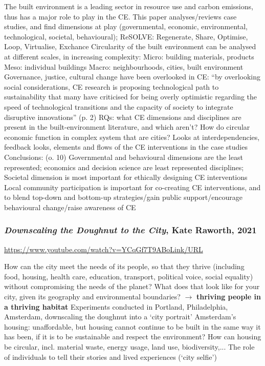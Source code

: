 \documentclass{article}
\begin{document}
\begin{outline}
	\1 The built environment is a leading sector in resource use and carbon emissions, thus has a major role to play in the CE. This paper analyses/reviews case studies, and find dimensions at play (governmental, economic, environmental, technological, societal, behavioural); 
	\1 ReSOLVE: Regenerate, Share, Optimise, Loop, Virtualise, Exchance
	\1 Circularity of the built environment can be analysed at different scales, in increasing complexity:
		\2 Micro: building materials, products
		\2 Meso: individual buildings
		\2 Macro: neighbourhoods, cities, built environment
	\1 Governance, justice, cultural change have been overlooked in CE: ``by overlooking social considerations, CE research is proposing  technological path to sustainability that many have criticised for being overly optimistic regarding the speed of technological transitions and the capacity of society to integrate disruptive innovations'' (p. 2)
	\1 RQs:  what CE dimensions and disciplines are present in the built-environment literature, and which aren't? How do circular economic function in complex system that are cities? 
		\2 Looks at interdependencies, feedback looks, elements and flows of the CE interventions in the case studies
	\1 Conclusions: (o. 10)
		\2 Governmental and behavioural dimensions are the least represented; economics and decision science are least represented disciplines; 
		\2 Societal dimension is most important for ethically designing CE interventions
		\2 Local community participation is important for co-creating CE interventions, and to blend top-down and bottom-up strategies/gain public support/encourage behavioural change/raise awareness of CE
	
\end{outline}

\subsubsection{\textit{Downscaling the Doughnut to the City}, Kate Raworth, 2021}

\url{https://www.youtube.com/watch?v=YCqGf7T9ABoLink/URL}

\begin{outline}
	\1 How can the city meet the needs of its people, so that they thrive (including food, housing, health care, education, transport, political voice, social equality) without compromising the needs of the planet? What does that look like for your city, given its geography and environmental boundaries? $\rightarrow$ \textbf{thriving people in a thriving habitat}
	\1	Experiments conducted in Portland, Philadelphia, Amsterdam, downscaling the doughnut into a `city portrait'
		\2 Amsterdam's housing: unaffordable, but housing cannot continue to be built in the same way it has been, if it is to be sustainable and respect the environment? How can housing be circular, incl. material waste, energy usage, land use, biodiversity,... 
	\1 The role of individuals to tell their stories and lived experiences (`city selfie')
\end{outline}
\end{document}
